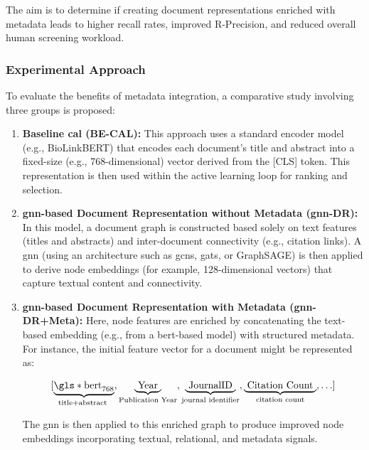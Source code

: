 \documentclass[10pt,oneside]{book}
\begin{document}
The aim is to determine if creating document representations enriched with metadata leads to higher recall rates, improved R-Precision, and reduced overall human screening workload.

\subsubsection{Experimental Approach} 

To evaluate the benefits of metadata integration, a comparative study involving three groups is proposed:

\begin{enumerate} \item \textbf{Baseline \gls*{cal} (BE-CAL)\cite{mao_reproducibility_2024}:}
This approach uses a standard encoder model (e.g., BioLinkBERT) that encodes each document’s title and abstract into a fixed-size (e.g., 768-dimensional) vector derived from the [CLS] token. This representation is then used within the active learning loop for ranking and selection.

\item \textbf{\gls*{gnn}-based Document Representation without Metadata (\gls*{gnn}-DR):}
In this model, a document graph is constructed based solely on text features (titles and abstracts) and inter-document connectivity (e.g., citation links). A \gls*{gnn} (using an architecture such as \glspl*{gcn}, \glspl*{gat}, or GraphSAGE) is then applied to derive node embeddings (for example, 128-dimensional vectors) that capture textual content and connectivity. 

\item \textbf{\gls*{gnn}-based Document Representation with Metadata (\gls*{gnn}-DR+Meta):}
Here, node features are enriched by concatenating the text-based embedding (e.g., from a \gls*{bert}-based model) with structured metadata. For instance, the initial feature vector for a document might be represented as:


\[
[\underbrace{\mathrm{\gls*{bert}}_{768}}_{\text {title+abstract }}, \underbrace{\text { Year }}_{\text{Publication Year}}, \underbrace{\text { JournalID }}_{\text{journal identifier}} , \underbrace{\text { Citation Count }}_{\text{citation count}} ,\ldots] 
\]

\vspace{0.5em}

The \gls*{gnn} is then applied to this enriched graph to produce improved node embeddings incorporating textual, relational, and metadata signals. \end{enumerate}
\end{document}
